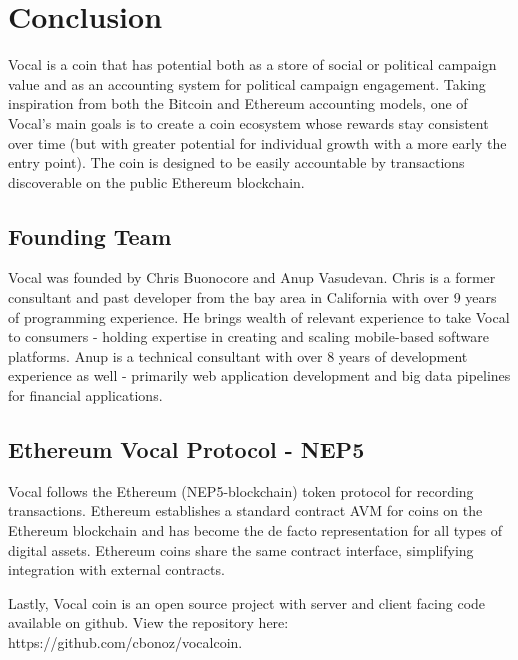 \documentclass[conference]{IEEEtran}
\begin{document}
    \FloatBarrier
    \section{Conclusion}
   Vocal is a coin that has potential both as a store of social or political campaign value and as an accounting system for political campaign engagement. Taking inspiration from both the Bitcoin and Ethereum accounting models, one of Vocal's main goals is to create a coin ecosystem whose rewards stay consistent over time (but with greater potential for individual growth with a more early the entry point). The coin is designed to be easily accountable by transactions discoverable on the public Ethereum blockchain.

    \subsection{Founding Team}
   Vocal was founded by Chris Buonocore and Anup Vasudevan. Chris is a former consultant and past developer from the bay area in California with over 9 years of programming experience.
   He brings wealth of relevant experience to take Vocal to consumers - holding expertise in creating and scaling mobile-based software platforms. Anup is a technical consultant with over 8
   years of development experience as well - primarily web application development and big data pipelines for financial applications.

    \subsection{Ethereum Vocal Protocol - NEP5}
   Vocal follows the Ethereum (NEP5-blockchain) token protocol for recording transactions.
    Ethereum establishes a standard contract AVM for coins on the Ethereum blockchain and has become the de facto representation for all types of digital assets. Ethereum coins share the same contract interface, simplifying integration with external contracts.

    Lastly, Vocal coin is an open source project with server and client facing code available on github. View the repository here: https://github.com/cbonoz/vocalcoin.

    \printbibliography
   
    
\end{document}

